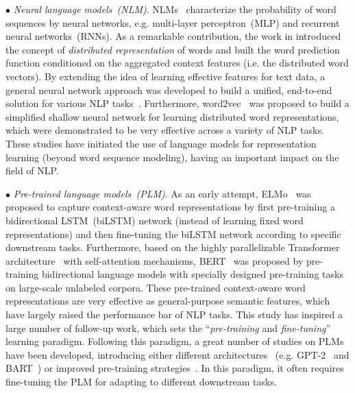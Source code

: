 $\bullet$ \emph{Neural language models~(NLM)}. NLMs~\cite{Bengio-JMLR-2003-A,Mikolov-INTERSPEECH-2010,Kombrink-INTERSPEECH-2011} characterize the probability of  word sequences by neural networks, e.g. multi-layer perceptron~(MLP) and recurrent neural networks~(RNNs). As a remarkable contribution, the work in \cite{Bengio-JMLR-2003-A} introduced the concept of \emph{distributed representation} of words and built the word prediction function conditioned on the aggregated context features (i.e. the distributed word vectors). By extending the idea of learning effective features for text data, a general neural network approach was developed to build a unified, end-to-end  solution for various NLP tasks~\cite{Collobert-JMLR-2011}. Furthermore, word2vec~\cite{Mikolov-NIPS-2013,Mikolov-ICLR-2013} was proposed to build a simplified shallow neural network for learning distributed word representations, which were demonstrated to be very effective across a variety of NLP tasks. These studies have initiated the use of language models for representation learning (beyond word sequence modeling),  having  an important impact on the field of NLP.  

$\bullet$ \emph{Pre-trained language models~(PLM)}. As an early attempt,  ELMo~\cite{Peters-NAACL-2018} was proposed to  capture  context-aware word representations by first pre-training a bidirectional LSTM~(biLSTM)  network ({instead of learning fixed word representations}) and then fine-tuning the biLSTM network according to specific downstream tasks.  Furthermore, based on the highly parallelizable Transformer architecture~\cite{Vaswani-NIPS-2017-Attention} with self-attention mechanisms, BERT~\cite{Devlin-NAACL-2019-BERT} was proposed by  pre-training  bidirectional language models with specially designed pre-training tasks on large-scale unlabeled corpora.  These pre-trained context-aware word representations are very effective as general-purpose semantic features, which have largely raised the performance bar of NLP tasks. This study has inspired a large number of follow-up work, which sets the ``\emph{pre-training} and \emph{fine-tuning}'' learning paradigm. Following this paradigm, a great number of studies on PLMs have been developed, introducing either different architectures~\cite{Lewis-ACL-2020-BART,Fedus-JMLR-2021-Switch} (e.g. GPT-2~\cite{radford-blog-2019-language} and BART~\cite{Lewis-ACL-2020-BART}) or improved pre-training strategies~\cite{Liu-CoRR-2019-RoBERTa,Sanh-ICLR-2022-Multitask,Wang-ICML-2022-What}. In this paradigm, it often requires fine-tuning the PLM for adapting to different downstream tasks.  

